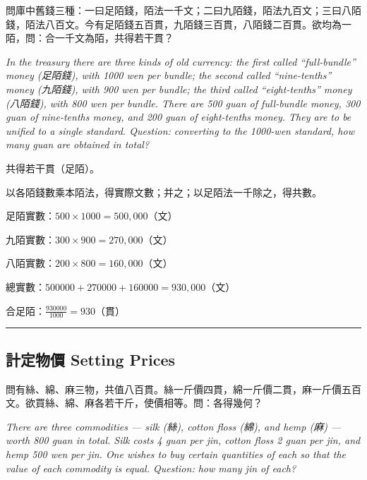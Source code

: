 \documentclass[11pt,a4paper]{article}
\newcommand{\longline}{\noindent\rule{\textwidth}{0.4pt}}
\begin{document}
\begin{problem}
問庫中舊錢三種：一曰足陌錢，陌法一千文；二曰九陌錢，陌法九百文；三曰八陌錢，陌法八百文。今有足陌錢五百貫，九陌錢三百貫，八陌錢二百貫。欲均為一陌，問：合一千文為陌，共得若干貫？

\textit{In the treasury there are three kinds of old currency: the first called ``full-bundle'' money (足陌錢), with 1000 wen per bundle; the second called ``nine-tenths'' money (九陌錢), with 900 wen per bundle; the third called ``eight-tenths'' money (八陌錢), with 800 wen per bundle. There are 500 guan of full-bundle money, 300 guan of nine-tenths money, and 200 guan of eight-tenths money. They are to be unified to a single standard. Question: converting to the 1000-wen standard, how many guan are obtained in total?}
\end{problem}

\begin{answer}
共得若干貫（足陌）。
\end{answer}

\begin{method}
以各陌錢數乘本陌法，得實際文數；并之；以足陌法一千除之，得共數。
\end{method}

\begin{working}
足陌實數：$500 \times 1000 = 500{,}000$（文）

九陌實數：$300 \times 900 = 270{,}000$（文）

八陌實數：$200 \times 800 = 160{,}000$（文）

總實數：$500000 + 270000 + 160000 = 930{,}000$（文）

合足陌：$\displaystyle\frac{930000}{1000} = 930$（貫）
\end{working}

\vspace{0.5em}
\longline

\subsection{計定物價 \quad Setting Prices}

\begin{problem}
問有絲、綿、麻三物，共值八百貫。絲一斤價四貫，綿一斤價二貫，麻一斤價五百文。欲買絲、綿、麻各若干斤，使價相等。問：各得幾何？

\textit{There are three commodities --- silk (絲), cotton floss (綿), and hemp (麻) --- worth 800 guan in total. Silk costs 4 guan per jin, cotton floss 2 guan per jin, and hemp 500 wen per jin. One wishes to buy certain quantities of each so that the value of each commodity is equal. Question: how many jin of each?}
\end{problem}
\end{document}
